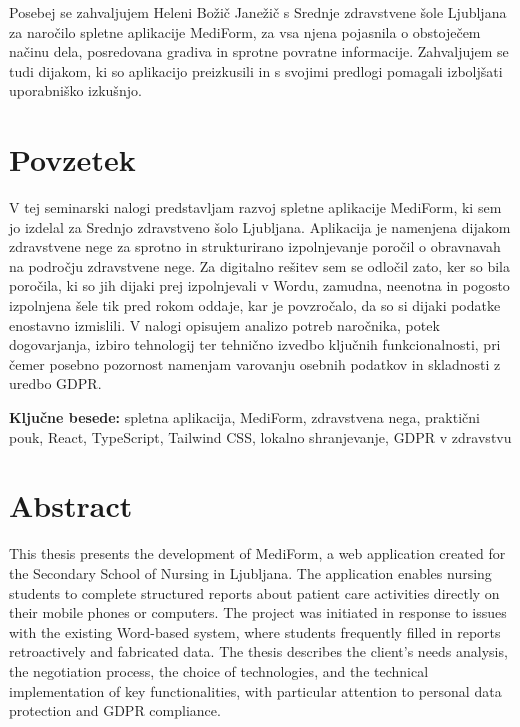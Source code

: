 \documentclass[12pt,a4paper]{article}
\begin{document}
Posebej se zahvaljujem Heleni Bo\v{z}i\v{c} Jane\v{z}i\v{c} s Srednje zdravstvene \v{s}ole Ljubljana za naro\v{c}ilo spletne aplikacije MediForm, za vsa njena pojasnila o obstoje\v{c}em na\v{c}inu dela, posredovana gradiva in sprotne povratne informacije. Zahvaljujem se tudi dijakom, ki so aplikacijo preizkusili in s svojimi predlogi pomagali izbolj\v{s}ati uporabni\v{s}ko izku\v{s}njo.

\newpage
\thispagestyle{empty}

\section*{Povzetek}

V tej seminarski nalogi predstavljam razvoj spletne aplikacije MediForm, ki sem jo izdelal za Srednjo zdravstveno \v{s}olo Ljubljana. Aplikacija je namenjena dijakom zdravstvene nege za sprotno in strukturirano izpolnjevanje poro\v{c}il o obravnavah na podro\v{c}ju zdravstvene nege. Za digitalno re\v{s}itev sem se odlo\v{c}il zato, ker so bila poročila, ki so jih dijaki prej izpolnjevali v Wordu, zamudna, neenotna in pogosto izpolnjena \v{s}ele tik pred rokom oddaje, kar je povzro\v{c}alo, da so si dijaki podatke enostavno izmislili. V nalogi opisujem analizo potreb naro\v{c}nika, potek dogovarjanja, izbiro tehnologij ter tehni\v{c}no izvedbo klju\v{c}nih funkcionalnosti, pri \v{c}emer posebno pozornost namenjam varovanju osebnih podatkov in skladnosti z uredbo GDPR.

\textbf{Klju\v{c}ne besede:} spletna aplikacija, MediForm, zdravstvena nega, prakti\v{c}ni pouk, React, TypeScript, Tailwind CSS, lokalno shranjevanje, GDPR v zdravstvu

\vspace{2cm}

\section*{Abstract}

This thesis presents the development of MediForm, a web application created for the Secondary School of Nursing in Ljubljana. The application enables nursing students to complete structured reports about patient care activities directly on their mobile phones or computers. The project was initiated in response to issues with the existing Word-based system, where students frequently filled in reports retroactively and fabricated data. The thesis describes the client's needs analysis, the negotiation process, the choice of technologies, and the technical implementation of key functionalities, with particular attention to personal data protection and GDPR compliance.
\end{document}

